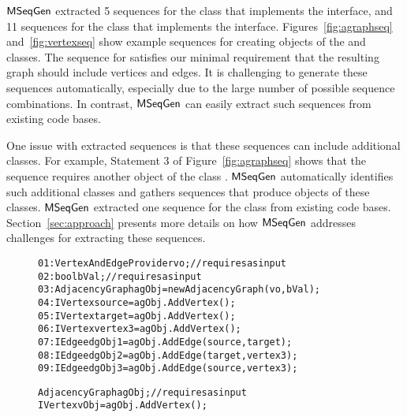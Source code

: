 $\textsf{MSeqGen} $ extracted 5 sequences for the  class that implements the  interface, and 11 sequences for the  class that implements the  interface. Figures~\ref{fig:agraphseq} and~\ref{fig:vertexseq} show example sequences for creating objects of the  and  classes. The  sequence for   satisfies our minimal requirement that the resulting graph should include vertices and edges. It is challenging to generate these sequences automatically, especially due to the large number of possible sequence combinations. In contrast, $\textsf{MSeqGen} $ can easily extract such sequences from existing code bases.

One issue with extracted sequences is that these sequences can include additional classes. For example,
Statement 3 of Figure~\ref{fig:agraphseq} shows that the  sequence requires another object of the class . $\textsf{MSeqGen} $ automatically identifies such additional classes and gathers sequences that produce objects of these classes. $\textsf{MSeqGen} $ extracted one  sequence for the  class from existing code bases. Section~\ref{sec:approach} presents more details on how $\textsf{MSeqGen} $ addresses challenges for extracting these sequences.

\begin{figure}[t]
\begin{CodeOut}
\begin{alltt}
01: VertexAndEdgeProvider vo; //requires as input
02: bool bVal; //requires as input
03: AdjacencyGraph agObj = new AdjacencyGraph(vo,bVal); 
04: IVertex source = agObj.AddVertex();
05: IVertex target = agObj.AddVertex();
06: IVertex vertex3 = agObj.AddVertex();
07: IEdge edgObj1 = agObj.AddEdge(source,target); 
08: IEdge edgObj2 = agObj.AddEdge(target,vertex3);
09: IEdge edgObj3 = agObj.AddEdge(source,vertex3);
\end{alltt}
\end{CodeOut}\vspace*{-4ex}
\vspace*{-2ex}
\end{figure}
\begin{figure}[t]
\begin{CodeOut}
\begin{alltt}
AdjacencyGraph agObj; //requires as input
IVertex vObj = agObj.AddVertex();
\end{alltt}
\end{CodeOut}\vspace*{-4ex}
\vspace*{-4ex}
\end{figure}


